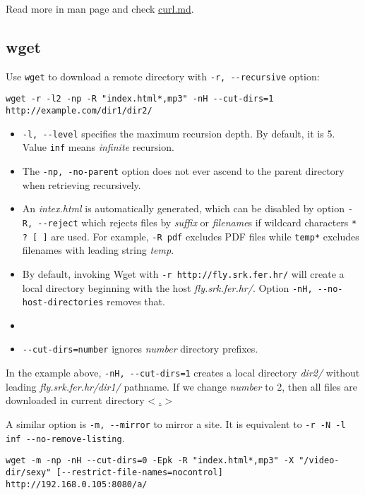 Read more in man page and check
\href{https://gist.github.com/subfuzion/08c5d85437d5d4f00e58}{curl.md}.

\subsection{wget}
\label{sec:wget}

Use \lstinline|wget| to download a remote directory with
\lstinline|-r, --recursive| option:

\begin{lstlisting}
wget -r -l2 -np -R "index.html*,mp3" -nH --cut-dirs=1 http://example.com/dir1/dir2/
\end{lstlisting}

\begin{itemize}
\item \lstinline|-l, --level| specifies the maximum recursion
  depth. By default, it is 5. Value \lstinline|inf| means
  \textit{infinite} recursion.
\item The \lstinline|-np, -no-parent| option does not ever ascend
  to the parent directory when retrieving recursively.
\item An \textit{intex.html} is automatically generated, which can
  be disabled by option \lstinline|-R, --reject| which rejects
  files by \textit{suffix} or \textit{filename}s if wildcard
  characters \lstinline|* ? [ ]| are used. For example,
  \lstinline|-R pdf| excludes PDF files while \lstinline|temp*|
  excludes filenames with leading string \textit{temp}.
\item By default, invoking Wget with
  \lstinline|-r http://fly.srk.fer.hr/| will create a local
  directory beginning with the host
  \textit{fly.srk.fer.hr/}. Option
  \lstinline|-nH, --no-host-directories| removes that.
\item \item \lstinline|--cut-dirs=number| ignores \textit{number}
  directory prefixes.
\end{itemize}

In the example above, \lstinline|-nH, --cut-dirs=1| creates a
local directory \textit{dir2/} without leading
\textit{fly.srk.fer.hr/dir1/} pathname. If we change
\textit{number} to 2, then all files are downloaded in current
directory < \uline{.} >

A similar option is \lstinline|-m, --mirror| to mirror a site. It
is equivalent to \lstinline|-r -N -l inf --no-remove-listing|.

\begin{lstlisting}
wget -m -np -nH --cut-dirs=0 -Epk -R "index.html*,mp3" -X "/video-dir/sexy" [--restrict-file-names=nocontrol] http://192.168.0.105:8080/a/
\end{lstlisting}

